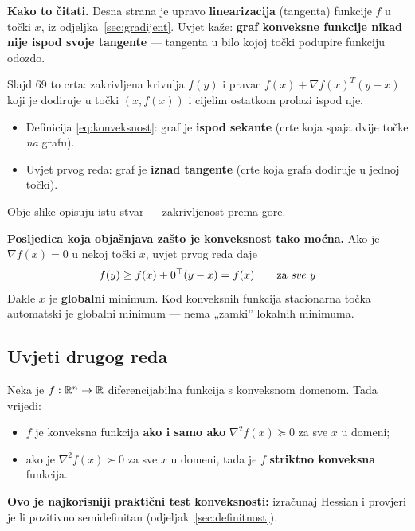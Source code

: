 \textbf{Kako to čitati.} Desna strana je upravo \textbf{linearizacija}
(tangenta) funkcije $f$ u točki $x$, iz odjeljka~\ref{sec:gradijent}. Uvjet
kaže: \textbf{graf konveksne funkcije nikad nije ispod svoje tangente} ---
tangenta u bilo kojoj točki podupire funkciju odozdo.

Slajd 69 to crta: zakrivljena krivulja $f(y)$ i pravac
$f(x) + \nabla f(x)^T(y-x)$ koji je dodiruje u točki $(x, f(x))$ i cijelim
ostatkom prolazi ispod nje.

\begin{napomena}
\begin{itemize}
  \item Definicija \eqref{eq:konveksnost}: graf je \textbf{ispod sekante}
        (crte koja spaja dvije točke \emph{na} grafu).
  \item Uvjet prvog reda: graf je \textbf{iznad tangente} (crte koja grafa
        dodiruje u jednoj točki).
\end{itemize}
Obje slike opisuju istu stvar --- zakrivljenost prema gore.
\end{napomena}

\textbf{Posljedica koja objašnjava zašto je konveksnost tako moćna.} Ako je
$\nabla f(x) = 0$ u nekoj točki $x$, uvjet prvog reda daje
\[
f(y) \ge f(x) + 0^{\top}(y-x) = f(x) \qquad\text{za \emph{sve} } y
\]
Dakle $x$ je \textbf{globalni} minimum. Kod konveksnih funkcija stacionarna
točka automatski je globalni minimum --- nema „zamki” lokalnih minimuma.

\subsection{Uvjeti drugog reda}

\begin{teorem}
Neka je $f : \mathbb{R}^n \to \mathbb{R}$ diferencijabilna funkcija s konveksnom domenom. Tada
vrijedi:
\begin{itemize}
  \item $f$ je konveksna funkcija \textbf{ako i samo ako} $\nabla^2f(x)
        \succeq 0$ za sve $x$ u domeni;
  \item ako je $\nabla^2f(x) \succ 0$ za sve $x$ u domeni, tada je $f$
        \textbf{striktno konveksna} funkcija.
\end{itemize}
\end{teorem}

\textbf{Ovo je najkorisniji praktični test konveksnosti:} izračunaj Hessian i
provjeri je li pozitivno semidefinitan (odjeljak~\ref{sec:definitnost}).

